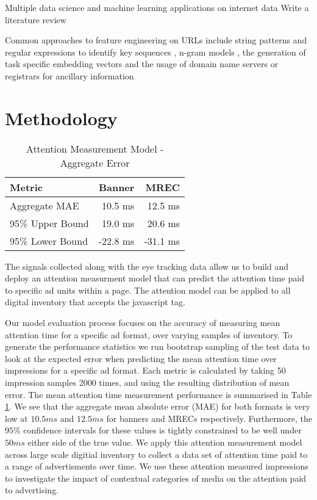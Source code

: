 \documentclass[sigconf]{acmart}
\begin{document}
Multiple data science and machine learning applications on internet data 
Write a literature review \cite{Vazhayil2018}
\cite{Canali2011}
\cite{Ayes2019}
\cite{Mamun2016}
\cite{Li2020}
\cite{Basnet2012}
\cite{Basnet2014}
\cite{Tupsamudre2019}
\cite{Le2018}
\cite{Baykan2009}
\cite{Kan2005}
\cite{Hernandez2012}
\cite{Chung2010}
\cite{Qiu2020}
\cite{Vaishnavi2021}
\cite{Xu2021}
\cite{Rhea2022}
\cite{Ma2009}
\cite{Verma2017}
\cite{Sountharrajan2020}

Common approaches to feature engineering on URLs include string patterns and regular expressions to
identify key sequences \cite{}, n-gram models \cite{Baykan2009}, 
the generation of task specific embedding vectors\cite{Qiu2020} and the
usage of domain name servers or registrars for ancillary information \cite{}


\section{Methodology}


\begin{table}
  \caption{Attention Measurement Model - Aggregate Error}
  \label{tab:atm}
\begin{tabular}{|l|r|r|}
\toprule
Metric                  &Banner       &MREC       \\
\midrule
Aggregate MAE           &10.5 ms      &12.5 ms    \\
95\% Upper Bound        &19.0 ms      &20.6 ms    \\
95\% Lower Bound        &-22.8 ms     &-31.1 ms   \\
  \bottomrule
\end{tabular}
\end{table}

The signals collected along with the eye tracking data allow us to build and deploy an
attention measurment model that can predict the attention time paid to
specific ad units within a page. The attention model can
be applied to all digital inventory that accepts the javascript tag.

Our model evaluation process focuses on the accuracy of measuring mean
attention time for a specific ad format, over varying samples of inventory.
To generate the performance statistics we run bootstrap sampling of the test data
to look at the expected error when predicting the mean attention time over
impressions for a specific ad format. Each metric is calculated by taking 50 impression
samples 2000 times, and using the resulting distribution of mean error.
The mean attention time measurement performance is summarised in Table
\ref{tab:atm}.
We see that the aggregate mean absolute error (MAE) for both formats is very low
at $10.5 ms$ and $12.5 ms$ for banners and MRECs respectively. Furthermore, the
$95\%$ confidence intervals for these values is tightly constrained to be well under
$50 ms$ either side of the true value.
We apply this attention measurement model across large scale digitial inventory to
collect a data set of attention time paid to a range of advertisments over time.
We use these attention measured impressions to investigate the
impact of contextual categories of media on the attention paid to advertising.
\end{document}
